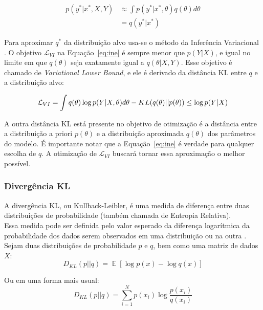 \begin{align*}
  \label {eq:pq}
    p(y^* | x^* , X,Y) &\approx \int  p(y^* | x^*,\theta) q(\theta)d\theta \\
                       &= q(y^* | x^*)
\end{align*}

 Para aproximar $q^*$ da distribuição alvo usa-se o método da Inferência
Variacional \citep{bayesml}. O objetivo $\mathcal{L}_{VI}$ na
Equação~\ref{eq:ine} é sempre menor que $p(Y|X)$, e igual no limite em que
$q(\theta)$ seja exatamente igual a $q(\theta | X,Y)$. Esse objetivo é chamado de
\textit{Variational Lower Bound}, e ele é derivado da distância KL entre $q$ e
a distribuição alvo:

\begin{equation}
  \label {eq:ine}
  \mathcal{L}_{VI} = \int q(\theta) \log p(Y | X,\theta)d\theta - \mathnormal{KL}(q(\theta) ||p(\theta)) \\
                  \leq \log p(Y|X)
\end{equation}

A outra distância KL está presente no objetivo de otimização é a
distância entre a distribuição a priori $p(\theta)$ e a distribuição aproximada
$q(\theta)$ dos parâmetros do modelo. É importante notar que a Equação~\ref{eq:ine} é verdade para qualquer escolha de
$q$. A otimização de $\mathcal{L}_{VI}$ buscará tornar essa aproximação o melhor possível.



\subsubsection{Divergência KL}

A divergência KL, ou Kullback-Leibler, é uma medida de diferença entre duas distribuições de probabilidade (também chamada de Entropia Relativa). \\
Essa medida pode ser definida pelo valor esperado da diferença logarítmica da probabilidade dos dados serem observados em uma distribuição ou na outra \citep{dlbook}. \\
Sejam duas distribuições de probabilidade $p$ e $q$, bem como uma matriz de dados $X$: \\

\[D_{KL}(p || q) = \mathop{\mathbb{E}}[\log p(x) - \log q(x)]​\]

Ou em uma forma mais usual: \\

\[D_{KL}(p||q) = \sum_{i=1}^{N}p(x_{i}) \log \frac{p(x_{i})}{q(x_{i})}​\]



